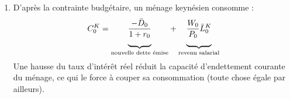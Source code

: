 \documentclass[a4paper,11pt]{article}
\begin{document}
\begin{enumerate}

\item D'apr\`{e}s la contrainte budgétaire, un ménage keynésien
consomme :%
\begin{equation}
C_{0}^{K}=\underset{\text{nouvelle dette émise}}{\underbrace{\underset{}{%
\frac{-\bar{D}_{0}}{1+r_{0}}}}}+\underset{\text{revenu
salarial}}{\underbrace{\underset{}{\frac{W_{0}}{P_{0}}\bar{L}_{0}^{K}}}}
\label{2 - Conso keynesien}
\end{equation}%
Une hausse du taux d'intérêt réel réduit la capacité
d'endettement courante du ménage, ce qui le force à couper sa
consommation (toute chose égale par ailleurs).



\end{enumerate}
\end{document}
